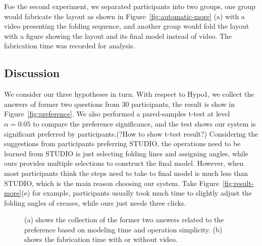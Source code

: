 Foe the second experiment, we separated participants into two groups, one group would fabricate the layout as shown in Figure~\ref{fig:automatic-more} (a) with a video presenting the folding sequence, and another group would fold the layout with a figure showing the layout and its final model instead of video. The fabrication time was recorded for analysis. 

\subsection{Discussion}
We consider our three hypotheses in turn. With respect to Hypo1, we collect the answers of former two questions from 30 participants, the result is show in Figure~\ref{fig:preference}. We also performed a pared-samples t-test at level $\alpha = 0.05$ to compare the preference significance, and the test shows our system is significant preferred by participants.(?How to show t-test result?) Considering the suggestions from participants preferring STUDIO, the operations need to be learned from STUDIO is just selecting folding lines and assigning angles, while ours provides multiple selections to construct the final model. However, when most participants think the steps need to take to final model is much less than STUDIO, which is the main reason choosing our system. Take Figure~\ref{fig:result-more}(e) for example, participants usually took much time to slightly adjust the folding angles of creases, while ours just needs three clicks.


\begin{figure}
	\centering
	\vspace{-1ex}
	\caption{(a) shows the collection of the former two answers related to the preference based on modeling time and operation simplicity. (b) shows the fabrication time with or without video.  }
	\label{fig:data}
\end{figure}


